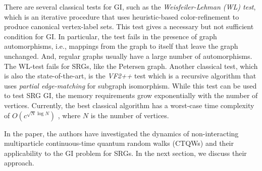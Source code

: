 \documentclass[twocolumn,a4paper,english,10pt]{article}
\begin{document}
There are several classical tests for GI, such as the \textit{Weisfeiler-Lehman (WL) test}, which is an iterative 
procedure that uses heuristic-based color-refinement to produce canonical vertex-label sets. This test gives a 
necessary but not sufficient condition for GI. In particular, the test fails in the presence of graph automorphisms, i.e., 
mappings from the graph to itself that leave the graph unchanged. And, regular graphs usually have a large number of 
automorphisms. The WL-test fails for SRGs, like the Petersen graph. Another classical test, which is also the state-of-the-art, 
is the \textit{VF2++} test \cite{vf2} which is a recursive algorithm that uses \textit{partial edge-matching} for subgraph isomorphism. 
While this test can be used to test SRG GI, the memory requirements grow exponentially with the number of vertices. Currently, 
the best classical algorithm has a worst-case time complexity of $O(c^{\sqrt{N}\log N})$ \cite{main}, where $N$ is the number of vertices.

In the paper, the authors have investigated the dynamics of non-interacting 
multiparticle continuous-time quantum random walks (CTQWs) and their applicability 
to the GI problem for SRGs. In the next section, we discuss their approach.
\end{document}
